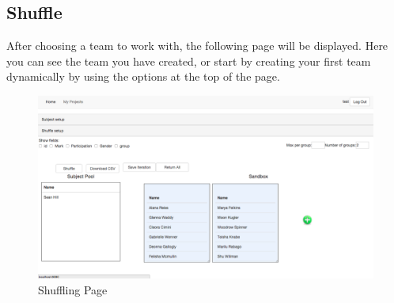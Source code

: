 \subsection{Shuffle}\par
After choosing a team to work with, the following page will be displayed.  Here you can see the team you have created, or start by creating your first team dynamically by using the options at the top of the page.\par
 \begin{figure}[H] 
	\centering
	\includegraphics[width=13cm]{./graphics/Shuffle.jpg}\par
	\caption{Shuffling Page}
\end{figure}

\newpage
